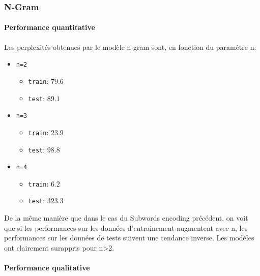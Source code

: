 \hypertarget{n-gram}{%
\subsubsection{N-Gram}\label{n-gram}}

\hypertarget{performance-quantitative}{%
\paragraph{Performance quantitative}\label{performance-quantitative}}

Les perplexités obtenues par le modèle n-gram sont, en fonction du
paramètre n:

\begin{itemize}
\tightlist
\item
  \texttt{n=2}

  \begin{itemize}
  \tightlist
  \item
    \texttt{train}: \(79.6\)
  \item
    \texttt{test}: \(89.1\)
  \end{itemize}
\item
  \texttt{n=3}

  \begin{itemize}
  \tightlist
  \item
    \texttt{train}: \(23.9\)
  \item
    \texttt{test}: \(98.8\)
  \end{itemize}
\item
  \texttt{n=4}

  \begin{itemize}
  \tightlist
  \item
    \texttt{train}: \(6.2\)
  \item
    \texttt{test}: \(323.3\)
  \end{itemize}
\end{itemize}

De la même manière que dans le cas du Subwords encoding précédent, on voit que si les performances sur les données d'entrainement augmentent avec n, les performances sur les données de tests suivent une tendance inverse. Les modèles ont clairement surappris pour n>2. 

\hypertarget{performance-qualitative}{%
\paragraph{Performance qualitative}\label{performance-qualitative}}

